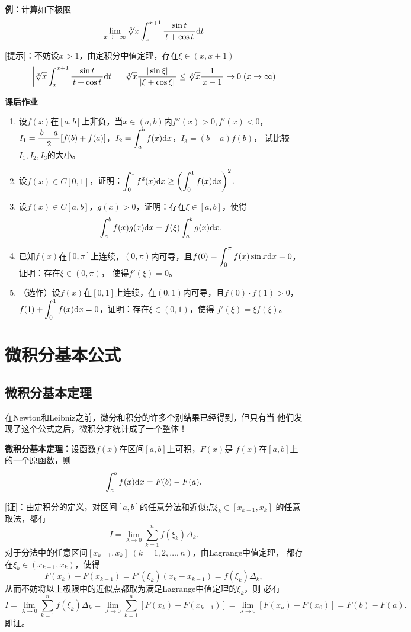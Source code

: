 {\bf 例：}计算如下极限
$$\lim\limits_{x\to{+\infty}}\sqrt[3]x\displaystyle\int_x^{x+1}\displaystyle\frac{\,{\sin t}\,}{\,{t+\cos t}\,}\mathrm{d} t$$

[提示]：不妨设$x>1$，由定积分中值定理，存在$\xi\in(x,x+1)$
$$\left|\sqrt[3]x\displaystyle\int_x^{x+1}\displaystyle\frac{\,{\sin t}\,}{\,{t+\cos t}\,}\mathrm{d} t\right|
=\sqrt[3]x\displaystyle\frac{\,{|\sin\xi|}\,}{\,{|\xi+\cos\xi|}\,}\leq\sqrt[3]x\displaystyle\frac{\,{1}\,}{\,{x-1}\,}
\to0\;(x\to\infty)$$

\begin{ext}
	{\bf 课后作业}
	
	\begin{enumerate}
	  \item 设$f(x)$在$[a,b]$上非负，当$x\in(a,b)$内$f''(x)>0,f'(x)<0$，
		$I_1=\displaystyle\frac{\,{b-a}\,}{\,{2}\,}[f(b)+f(a)]$，$I_2=\displaystyle\int_a^bf(x)\mathrm{d} x$，$I_3=(b-a)f(b)$，
		试比较$I_1,I_2,I_3$的大小。
	  \item 设$f(x)\in C[0,1]$，证明：$\displaystyle\int_0^1f^2(x)\mathrm{d} x\geq
	  \left(\displaystyle\int_0^1f(x)\mathrm{d} x\right)^2$.
	  \item 设$f(x)\in C[a,b]$，$g(x)>0$，证明：存在$\xi\in[a,b]$，使得
	  $$\displaystyle\int_a^bf(x)g(x)\mathrm{d} x=f(\xi)\displaystyle\int_a^bg(x)\mathrm{d} x.$$
	  \item 已知$f(x)$在$[0,\pi]$上连续，$(0,\pi)$内可导，且$f(0)=
	  \displaystyle\int_0^{\pi}f(x)\sin x\mathrm{d} x=0$，证明：存在$\xi\in(0,\pi)$，
	  使得$f'(\xi)=0$。
	  \item （选作）设$f(x)$在$[0,1]$上连续，在$(0,1)$内可导，且$f(0)\cdot f(1)>0$，
	  $f(1)+\displaystyle\int_0^1f(x)\mathrm{d} x=0$，证明：存在$\xi\in(0,1)$，使得
	  $f'(\xi)=\xi f(\xi)$。
	\end{enumerate}
\end{ext}

\section{微积分基本公式}

\subsection{微积分基本定理}

在Newton和Leibniz之前，微分和积分的许多个别结果已经得到，但只有当
他们发现了这个公式之后，微积分才统计成了一个整体！

\begin{thx}
	{\bf 微积分基本定理：}设函数$f(x)$在区间$[a,b]$上可积，$F(x)$是
	$f(x)$在$[a,b]$上的一个原函数，则
	$$\displaystyle\int_a^bf(x)\mathrm{d} x=F(b)-F(a).$$
\end{thx}

[证]：由定积分的定义，对区间$[a,b]$的任意分法和近似点$\xi_k\in[x_{k-1},x_k]$
的任意取法，都有
$$I=\lim\limits_{\lambda\to 0}\sum\limits_{k=1}^nf(\xi_k)\Delta_k.$$
对于分法中的任意区间$[x_{k-1},x_k]\;(k=1,2,\ldots,n)$，由Lagrange中值定理，
都存在$\xi_k\in(x_{k-1},x_k)$，使得
$$F(x_k)-F(x_{k-1})=F'(\xi_k)(x_k-x_{k-1})=f(\xi_k)\Delta_k,$$
从而不妨将以上极限中的近似点都取为满足Lagrange中值定理的$\xi_k$，则
必有
$$I=\lim\limits_{\lambda\to 0}\sum\limits_{k=1}^nf(\xi_k)\Delta_k
=\lim\limits_{\lambda\to 0}\sum\limits_{k=1}^n[F(x_k)-F(x_{k-1})]
=\lim\limits_{\lambda\to 0}[F(x_n)-F(x_0)]=F(b)-F(a).$$
即证。\fin

